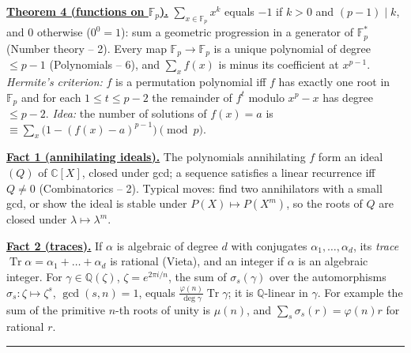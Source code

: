 \documentclass[11pt,a4paper]{article}
\newcommand{\head}[1]{\par\medskip\noindent\textbf{\underline{#1}}\quad}
\begin{document}
\head{Theorem 4 (functions on $\mathbb{F}_p$).} $\sum_{x\in\mathbb{F}_p}x^k$ equals $-1$ if
$k>0$ and $(p-1)\mid k$, and $0$ otherwise ($0^0=1$): sum a geometric progression in a
generator of $\mathbb{F}_p^*$ (Number theory -- 2). Every map $\mathbb{F}_p\to\mathbb{F}_p$ is a
unique polynomial of degree $\le p-1$ (Polynomials -- 6), and $\sum_xf(x)$ is minus its
coefficient at $x^{p-1}$. \emph{Hermite's criterion:} $f$ is a permutation polynomial iff $f$
has exactly one root in $\mathbb{F}_p$ and for each $1\le t\le p-2$ the remainder of $f^t$ modulo
$x^p-x$ has degree $\le p-2$. \emph{Idea:} the number of solutions of $f(x)=a$ is
$\equiv\sum_x\bigl(1-(f(x)-a)^{p-1}\bigr)\pmod p$.

\head{Fact 1 (annihilating ideals).} The polynomials annihilating $f$ form an ideal $(Q)$ of
$\mathbb{C}[X]$, closed under gcd; a sequence satisfies a linear recurrence iff $Q\neq0$
(Combinatorics -- 2). Typical moves: find two annihilators with a small gcd, or show the ideal
is stable under $P(X)\mapsto P(X^m)$, so the roots of $Q$ are closed under
$\lambda\mapsto\lambda^m$.

\head{Fact 2 (traces).} If $\alpha$ is algebraic of degree $d$ with conjugates
$\alpha_1,\dots,\alpha_d$, its \emph{trace} $\operatorname{Tr}\alpha=\alpha_1+\dots+\alpha_d$ is rational (Vieta),
and an integer if $\alpha$ is an algebraic integer. For $\gamma\in\mathbb{Q}(\zeta)$, $\zeta=e^{2\pi i/n}$, the sum
of $\sigma_s(\gamma)$ over the automorphisms $\sigma_s\colon\zeta\mapsto\zeta^s$, $\gcd(s,n)=1$, equals
$\frac{\varphi(n)}{\deg\gamma}\operatorname{Tr}\gamma$; it is $\mathbb{Q}$-linear in $\gamma$. For example the sum of the
primitive $n$-th roots of unity is $\mu(n)$, and $\sum_s\sigma_s(r)=\varphi(n)r$ for rational $r$.

\medskip\noindent\rule{\linewidth}{0.4pt}
\end{document}
